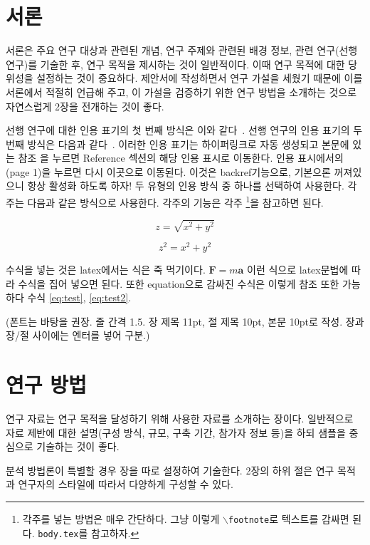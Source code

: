 \section{서론}


서론은 주요 연구 대상과 관련된 개념, 연구 주제와 관련된 배경 정보, 관련 연구(선행 연구)를 기술한 후, 연구 목적을 제시하는 것이 일반적이다. 이때 연구 목적에 대한 당위성을 설정하는 것이 중요하다. 제안서에 작성하면서 연구 가설을 세웠기 때문에 이를 서론에서 적절히 언급해 주고, 이 가설을 검증하기 위한 연구 방법을 소개하는 것으로 자연스럽게 2장을 전개하는 것이 좋다.

선행 연구에 대한 인용 표기의 첫 번째 방식은 이와 같다~\cite{google}. 선행 연구의 인용 표기의 두 번째 방식은 다음과 같다~\citep{texbook}. 이러한 인용 표기는 하이퍼링크로 자동 생성되고 본문에 있는 참조 \cite{google}을 누르면 Reference 섹션의 해당 인용 표시로 이동한다. 인용 표시에서의 (page 1)을 누르면 다시 이곳으로 이동된다. 이것은 backref기능으로, 기본으론 꺼져있으니 항상 활성화 하도록 하자! 두 유형의 인용 방식 중 하나를 선택하여 사용한다. 각주는 다음과 같은 방식으로 사용한다. 각주의 기능은 각주 \footnote{각주를 넣는 방법은 매우 간단하다. 그냥 이렇게 \texttt{$\backslash$footnote}로 텍스트를 감싸면 된다. \texttt{body.tex}를 참고하자.}을 참고하면 된다.

\begin{equation}
z=\sqrt{x^2+y^2}
\label{eq:test}
\end{equation}

\begin{equation}
z^2=x^2+y^2
\label{eq:test2}
\end{equation}

수식을 넣는 것은 latex에서는 식은 죽 먹기이다. $\mathbf{F}=m\mathbf{a}$ 이런 식으로 latex문법에 따라 수식을 집어 넣으면 된다. 또한 equation으로 감싸진 수식은 이렇게 참조 또한 가능하다 수식 \ref{eq:test}, \ref{eq:test2}.

(폰트는 바탕을 권장. 줄 간격 1.5. 장 제목 11pt, 절 제목 10pt, 본문 10pt로 작성. 장과 장/절 사이에는 엔터를 넣어 구분.)

\section{연구 방법}
연구 자료는 연구 목적을 달성하기 위해 사용한 자료를 소개하는 장이다. 일반적으로 자료 제반에 대한 설명(구성 방식, 규모, 구축 기간, 참가자 정보 등)을 하되 샘플을 중심으로 기술하는 것이 좋다.

분석 방법론이 특별할 경우 장을 따로 설정하여 기술한다. 2장의 하위 절은 연구 목적과 연구자의 스타일에 따라서 다양하게 구성할 수 있다. 

